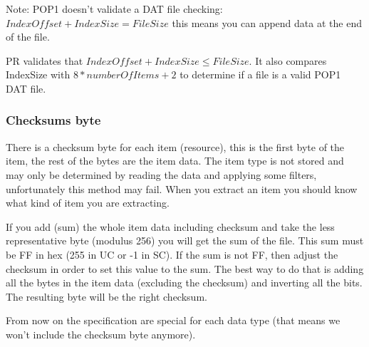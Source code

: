 \documentclass{article}
\begin{document}
%
%

 Note:
  POP1 doesn't validate a DAT file checking:
  $IndexOffset+IndexSize=FileSize$
  this means you can append data at the end of the file.

  PR validates that $IndexOffset+IndexSize \le FileSize$.
 It also compares IndexSize with $8*numberOfItems+2$ to determine if a file
  is a valid POP1 DAT file.

\subsubsection{Checksums byte}

 There is a  checksum byte for each item (resource), this is the first byte
 of the item, the rest of the bytes are the item data. The item type is not
 stored and may only be determined by reading the data and applying some
 filters, unfortunately this method may fail. When you extract an item you
 should know what kind of item you are extracting.

 If you add (sum) the whole item data including checksum and take the less
 representative byte (modulus 256) you will get the sum of the file. This
 sum must be FF in hex (255 in UC or -1 in SC). If the sum is not FF, then
 adjust the checksum in order to set this value to the sum. The best way
 to do that is adding all the bytes in the item data (excluding the
 checksum) and inverting all the bits. The resulting byte will be the
 right checksum.

 From now on the specification are special for each data type (that means
 we won't include the checksum byte anymore).
\end{document}
